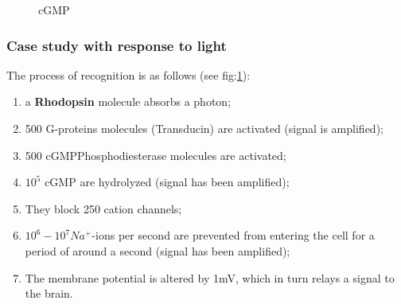 \documentclass[../main.tex]{subfiles}
\begin{document}
\begin{figure}[H]
	\caption{cGMP}
	\label{fig:cGMP}
\end{figure}

\subsubsection{Case study with response to light}

The process of recognition is as follows (see fig:\ref{fig:cGMP}):
\begin{enumerate}
	\item a \textbf{\gls{Rhodopsin}} molecule absorbs a photon;
	\item 500 G-proteins molecules (\gls{Transducin}) are activated (signal is amplified);
	\item 500 \gls{cGMPPhosphodiesterase} molecules are activated;
	\item $10^{5}$ \gls{cGMP} are hydrolyzed (signal has been amplified);
	\item They block 250 cation channels;
	\item $10^{6} - 10^{7} Na^{+}$-ions per second are prevented from entering the cell for a period of around a second (signal has been amplified);
	\item The membrane potential is altered by 1mV, which in turn relays a signal to the brain. 
\end{enumerate}
\end{document}
